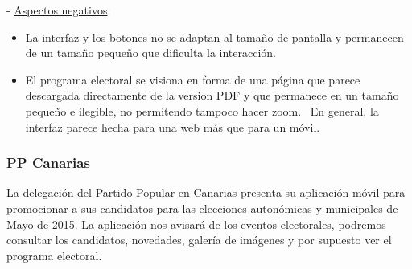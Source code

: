  - \underline{Aspectos negativos}:

\begin{itemize}
	\item La interfaz y los botones no se adaptan al tamaño de pantalla y permanecen de un tamaño pequeño que dificulta la interacción.
	\item El programa electoral se visiona en forma de una página que parece descargada directamente de la version PDF y que permanece en un tamaño pequeño e ilegible, no permitendo tampoco hacer zoom.
	\ En general, la interfaz parece hecha para una web más que para un móvil. 
\end{itemize}

\subsubsection{PP Canarias}

La delegación del Partido Popular en Canarias presenta su aplicación móvil para promocionar a sus candidatos para las elecciones autonómicas y municipales de Mayo de 2015. La aplicación nos avisará de los eventos electorales, podremos consultar los candidatos, novedades, galería de imágenes y por supuesto ver el programa electoral.

